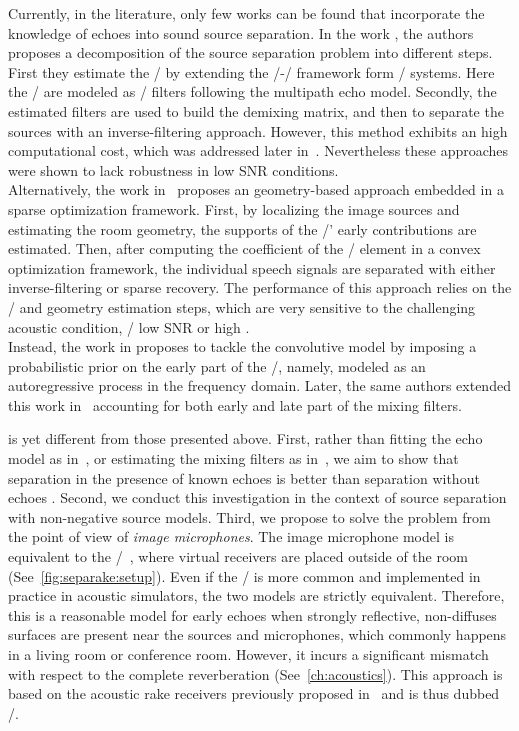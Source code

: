 Currently, in the literature, only few works can be found that incorporate the knowledge of echoes into sound source separation.
In the work , the authors proposes a decomposition of the source separation problem into different steps.
First they estimate the \RIRs/ by extending the \SIMO/-\BCE/ framework form \MIMO/ systems.
Here the \RIRs/ are modeled as \FIR/ filters following the multipath echo model.
Secondly, the estimated filters are used to build the demixing matrix, and then to separate the sources with an inverse-filtering approach.
However, this method exhibits an high computational cost, which was addressed later in~.
Nevertheless these approaches were shown to lack robustness in low SNR conditions.
\\Alternatively, the work in~ proposes an geometry-based approach embedded in a sparse optimization framework.
First, by localizing the image sources and estimating the room geometry, the supports of the \RIRs/' early contributions are estimated.
Then, after computing the coefficient of the \RIRs/ element in a convex optimization framework, the individual speech signals are separated with either inverse-filtering or sparse recovery.
The performance of this approach relies on the \RIR/ and geometry estimation steps, which are very sensitive to the challenging acoustic condition, \eg/ low SNR or high \RT.
\\Instead, the work in  proposes to tackle the convolutive model by imposing a probabilistic prior on the early part of the \RIRs/, namely, modeled as an autoregressive process in the frequency domain.
Later, the same authors extended this work in~ accounting for both early and late part of the mixing filters.


 is yet different from those presented above.
First, rather than fitting the echo model as in~, or estimating the mixing filters as in~,
we aim to show that separation in the presence of known echoes is better than separation without echoes .
Second, we conduct this investigation in the context of source separation with non-negative source models.
Third, we propose to solve the problem from the point of view of \textit{image microphones}.
The image microphone model is equivalent to the \ISMdef/~, where virtual receivers are placed outside of the room (See~\cref{fig:separake:setup}).
Even if the \ISM/ is more common and implemented in practice in acoustic simulators, the two models are strictly equivalent.
Therefore, this is a reasonable model for early echoes when strongly reflective, non-diffuses surfaces are present near the sources and microphones, which commonly happens in a living room or conference room.
However, it incurs a significant mismatch with respect to the complete reverberation (See~\cref{ch:acoustics}).
This approach is based on the acoustic rake receivers previously proposed in~ and is thus dubbed \SEPARAKEdef/.

